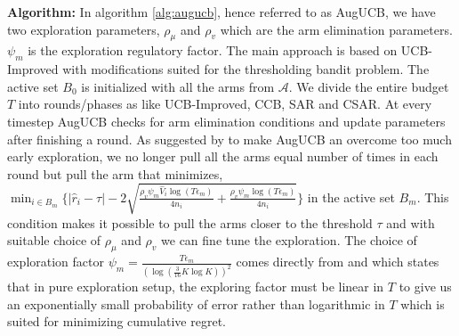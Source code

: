 \label{notation}

\textbf{Algorithm:} In algorithm \ref{alg:augucb}, hence referred to as AugUCB, we have two exploration parameters, $\rho_{\mu}$ and $\rho_v$ which are the arm elimination parameters. $\psi_{m}$ is the exploration regulatory factor. The main approach is based on UCB-Improved with modifications suited for the thresholding bandit problem. The active set $B_{0}$ is initialized with all the arms from $\mathcal{A}$. We divide the entire budget $T$ into rounds/phases as like UCB-Improved, CCB, SAR and CSAR. At every timestep AugUCB checks for arm elimination conditions and update parameters after finishing a round. As suggested by \cite{liu2016modification} to make AugUCB an overcome too much early exploration, we no longer pull all the arms equal number of times in each round but pull the arm that minimizes,  
$\min_{i\in B_{m}}\big\lbrace |\hat{r}_{i} - \tau | - 2\sqrt{\frac{\rho_v\psi_m \hat{V}_{i} \log ( T \epsilon_{m})}{4 n_{i}} + \frac{\rho_v\psi_m \log{( T\epsilon_{m})}}{4 n_{i}}} \big\rbrace $
in the active set $B_{m}$. This condition makes it possible to pull the arms closer to the threshold $\tau$ and with suitable choice of $\rho_{\mu}$ and $\rho_v$ we can fine tune the exploration. The choice of exploration factor $\psi_m=\frac{T\epsilon_m}{(\log(\frac{3}{16} K\log K))^{2}}$ comes directly from \cite{audibert2010best} and \cite{bubeck2011pure} which states that in pure exploration setup, the exploring factor must be linear in $T$ to give us an exponentially small probability of error rather than logarithmic in $T$ which is suited for minimizing cumulative regret.

